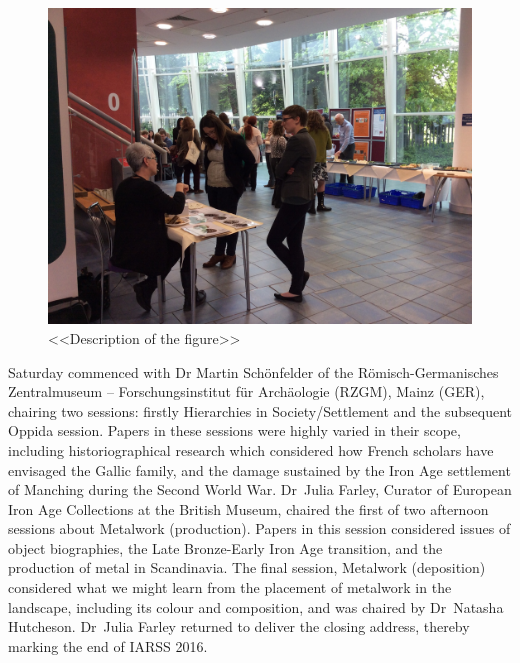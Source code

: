 \documentclass[ngerman,english]{ijsra}
\begin{document}
\begin{figure}
\includegraphics[width=\linewidth]{figures/IARSS_Break2}
\caption{<<Description of the figure>>}
\label{fig:IARSS_Break2}
\end{figure} 
Saturday commenced with Dr Martin Schönfelder of the \foreignlanguage{ngerman}{Römisch\--German\-isches Zentralmuseum --
 Forschungsinstitut für Archäologie} (RZGM), Mainz (GER), chairing two sessions: firstly Hierarchies in
  Society/Settlement and the subsequent Oppida session. Papers in these sessions were highly varied in
   their scope, including historiographical research which considered how French scholars have envisaged
    the Gallic family, and the damage sustained by the Iron Age settlement of Manching during the Second World War. 
Dr~Julia Farley, Curator of European Iron Age Collections at the British Museum, chaired the first of two afternoon sessions about Metalwork (production).  Papers in this session considered issues of object biographies, the Late Bronze-Early Iron Age transition, and the production of metal in Scandinavia. The final session, Metalwork (deposition) considered what we might learn from the placement of metalwork in the landscape, including its colour and composition, and was chaired by Dr~Natasha Hutcheson. 
Dr~Julia Farley returned to deliver the closing address, thereby marking the end of IARSS 2016.
\end{document}
